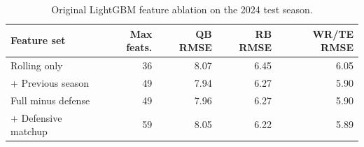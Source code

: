 \begin{table}[!htbp]
\caption{Original LightGBM feature ablation on the 2024 test season.}
\label{tab:ablation}
\centering
\footnotesize
\begin{tabular}{lrrrr}
\toprule
Feature set & Max feats. & QB RMSE & RB RMSE & WR/TE RMSE \\
\midrule
Rolling only & 36 & 8.07 & 6.45 & 6.05 \\
+ Previous season & 49 & 7.94 & 6.27 & 5.90 \\
Full minus defense & 49 & 7.96 & 6.27 & 5.90 \\
+ Defensive matchup & 59 & 8.05 & 6.22 & 5.89 \\
\bottomrule
\end{tabular}
\end{table}

